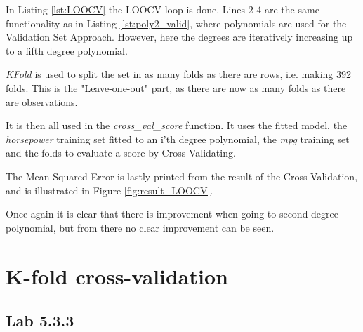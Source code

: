 In Listing \ref{lst:LOOCV} the LOOCV loop is done. Lines 2-4 are the same functionality as in Listing \ref{lst:poly2_valid}, where polynomials are used for the Validation Set Approach. However, here the degrees are iteratively increasing up to a fifth degree polynomial.

\emph{KFold} is used to split the set in as many folds as there are rows, i.e. making 392 folds. This is the "Leave-one-out" part, as there are now as many folds as there are observations. 

It is then all used in the \emph{cross\_val\_score} function. It uses the fitted model, the \emph{horsepower} training set fitted to an i'th degree polynomial, the \emph{mpg} training set and the folds to evaluate a score by Cross Validating.

The Mean Squared Error is lastly printed from the result of the Cross Validation, and is illustrated in Figure \ref{fig:result_LOOCV}.


Once again it is clear that there is improvement when going to second degree polynomial, but from there no clear improvement can be seen. 

\section{K-fold cross-validation}


\subsection{Lab 5.3.3}